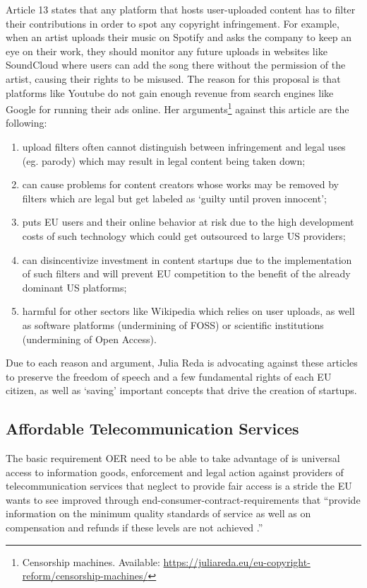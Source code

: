 \documentclass[a4paper]{article}
\begin{document}
Article 13 states that any platform that hosts user-uploaded content has to filter their contributions in order to spot any copyright infringement. For example, when an artist uploads their music on Spotify and asks the company to keep an eye on their work, they should monitor any future uploads in websites like SoundCloud where users can add the song there without the permission of the artist, causing their rights to be misused. The reason for this proposal is that platforms like Youtube do not gain enough revenue from search engines like Google for running their ads online. Her arguments\footnote{Censorship machines. Available: \url{https://juliareda.eu/eu-copyright-reform/censorship-machines/}} against this article are the following:
\begin{enumerate}
\item upload filters often cannot distinguish between infringement and legal uses (eg. parody) which may result in legal content being taken down;
\item can cause problems for content creators whose works may be removed by filters which are legal but get labeled as `guilty until proven innocent';
\item puts EU users and their online behavior at risk due to the high development costs of such technology which could get outsourced to large US providers;
\item can disincentivize investment in content startups  due to the implementation of such filters and will prevent EU competition to the benefit of the already dominant US platforms;
\item harmful for other sectors like Wikipedia which relies on user uploads, as well as software platforms (undermining of FOSS) or scientific institutions (undermining of Open Access).
\end{enumerate}

\noindent
Due to each reason and argument, Julia Reda is advocating against these articles to preserve the freedom of speech and a few fundamental rights of each EU citizen, as well as `saving' important concepts that drive the creation of startups.

\subsection{Affordable Telecommunication Services} 

The basic requirement OER need to be able to take advantage of is universal access to information goods, enforcement and legal action against providers of telecommunication services that neglect to provide fair access is a stride the EU wants to see improved through end-consumer-contract-requirements that ``provide information on the minimum quality standards of service as well as on compensation and refunds if these levels are not achieved \cite{ATC}.'' \\
\end{document}
